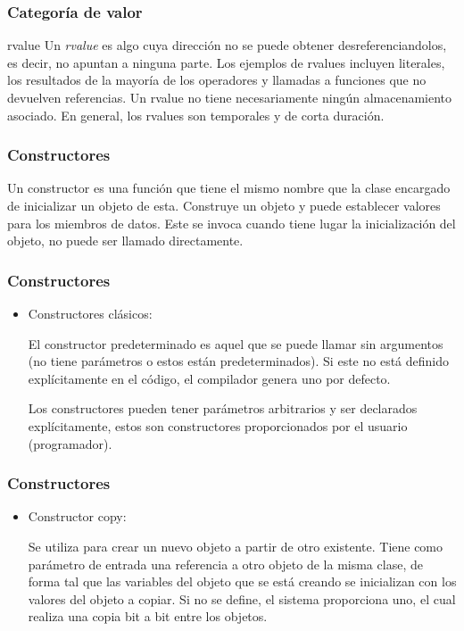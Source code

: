 \documentclass{beamer}
\begin{document}
	\begin{frame}
		\frametitle{Categor\'ia de valor}
		\begin{block}{rvalue}
			Un \textit{rvalue} es algo cuya dirección no se puede obtener desreferenciandolos, es decir, no apuntan a ninguna parte. Los ejemplos de rvalues incluyen literales, los resultados de la mayoría de los operadores y llamadas a funciones que no devuelven referencias. Un rvalue no tiene necesariamente ningún almacenamiento asociado. En general, los rvalues son temporales y de corta duración.
		\end{block}
	\end{frame}

	\begin{frame}
		\frametitle{Constructores}
		Un constructor es una función que tiene el mismo nombre que la clase encargado de inicializar un objeto de esta. Construye un objeto y puede establecer valores para los miembros de datos. Este se invoca cuando tiene lugar la inicialización del objeto, no puede ser llamado directamente.
	\end{frame}

	\begin{frame}
		\frametitle{Constructores}
		\begin{itemize}
			\item Constructores cl\'asicos:
			
			El constructor predeterminado es aquel que se puede llamar sin argumentos (no tiene parámetros o estos est\'an predeterminados). Si este no está definido explícitamente en el código, el compilador genera uno por defecto.
			
			Los constructores pueden tener parámetros arbitrarios y ser declarados expl\'icitamente, estos son constructores proporcionados por el usuario (programador).	
		\end{itemize}
	\end{frame}
	
		\begin{frame}
		\frametitle{Constructores}
		\begin{itemize}
			\item Constructor copy:
			
			Se utiliza para crear un nuevo objeto a partir de otro existente. Tiene como parámetro de entrada una referencia a otro objeto de la misma clase, de forma tal que las variables del objeto que se está creando se inicializan con los valores del objeto a copiar. Si no se define, el sistema proporciona uno, el cual realiza una copia bit a bit entre los objetos.
		\end{itemize}
	\end{frame}
\end{document}
